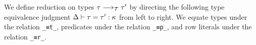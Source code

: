 \documentclass[authoryear, acmsmall, screen, review, nonacm]{acmart} %
\begin{document}
We define reduction on types $\tau \longrightarrow_{\mathcal T} \tau'$ by directing the following type equivalence judgment $\Delta \vdash \tau = \tau' : \kappa$ from left to right. We equate types under the relation \verb!_≡t_!, predicates under the relation \verb!_≡p_!, and row literals under the relation \verb!_≡r_!.

\begin{code}[hide]%
\>[0]\AgdaSpace{}%
\AgdaSpace{}%
\<%
\\
\>[0]\AgdaSpace{}%
\AgdaSpace{}%
\<%
\end{code}
\begin{code}%
\>[0]\AgdaSpace{}%
\AgdaSpace{}%
\AgdaSymbol{:}\AgdaSpace{}%
\AgdaSpace{}%
\AgdaSpace{}%
\AgdaSpace{}%
\AgdaOperator{\AgdaInductiveConstructor{R[}}\AgdaSpace{}%
\AgdaSpace{}%
\AgdaOperator{\AgdaInductiveConstructor{]}}\AgdaSpace{}%
\AgdaSpace{}%
\AgdaSpace{}%
\AgdaSpace{}%
\AgdaSpace{}%
\AgdaOperator{\AgdaInductiveConstructor{R[}}\AgdaSpace{}%
\AgdaSpace{}%
\AgdaOperator{\AgdaInductiveConstructor{]}}\AgdaSpace{}%
\AgdaSpace{}%
\<%
\\
\>[0]\AgdaSpace{}%
\AgdaSpace{}%
\AgdaSymbol{:}\AgdaSpace{}%
\AgdaSpace{}%
\AgdaSpace{}%
\AgdaSpace{}%
\AgdaSpace{}%
\AgdaSpace{}%
\AgdaSpace{}%
\AgdaSpace{}%
\AgdaSpace{}%
\<%
\\
\>[0]\AgdaSpace{}%
\AgdaSpace{}%
\AgdaSymbol{:}\AgdaSpace{}%
\AgdaSpace{}%
\AgdaSpace{}%
\AgdaSpace{}%
\AgdaOperator{\AgdaInductiveConstructor{R[}}\AgdaSpace{}%
\AgdaSpace{}%
\AgdaOperator{\AgdaInductiveConstructor{]}}\AgdaSpace{}%
\AgdaSpace{}%
\AgdaSpace{}%
\AgdaSpace{}%
\AgdaSpace{}%
\AgdaOperator{\AgdaInductiveConstructor{R[}}\AgdaSpace{}%
\AgdaSpace{}%
\AgdaOperator{\AgdaInductiveConstructor{]}}\AgdaSpace{}%
\AgdaSpace{}%
\<%
\end{code} 
\end{document}
